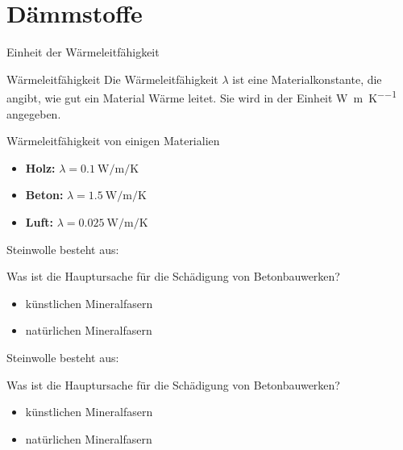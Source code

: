 \section{Dämmstoffe}
\BlueSectionSlide
\begin{frame}{Einheit der Wärmeleitfähigkeit}
	\begin{Definition_BS}{Wärmeleitfähigkeit}
		Die Wärmeleitfähigkeit $\lambda$ ist eine Materialkonstante, die angibt, wie gut ein Material Wärme leitet. Sie wird in der Einheit \si{\watt\per\meter\per\kelvin} angegeben.
	\end{Definition_BS}
	\pause
	\begin{Beispiel}{Wärmeleitfähigkeit von einigen Materialien}
		\begin{itemize}
			\item[\textbullet] \textbf{Holz:} $\lambda = \SI{0.1}{\watt\per\meter\per\kelvin}$
			\item[\textbullet] \textbf{Beton:} $\lambda = \SI{1.5}{\watt\per\meter\per\kelvin}$
			\item[\textbullet] \textbf{Luft:} $\lambda = \SI{0.025}{\watt\per\meter\per\kelvin}$
		\end{itemize}
	\end{Beispiel}
\end{frame}

\begin{frame}{Steinwolle besteht aus:}
    \begin{Fragenblock}
        Was ist die Hauptursache für die Schädigung von Betonbauwerken?
        
        \begin{itemize}
            \item[\faSquare] künstlichen Mineralfasern
            \item[\faSquare] natürlichen Mineralfasern
        \end{itemize}
    \end{Fragenblock}
\end{frame}

\begin{frame}{Steinwolle besteht aus:}
    \begin{Fragenblock}
        Was ist die Hauptursache für die Schädigung von Betonbauwerken?
        
        \begin{itemize}
			\item[\textcolor{green!70!black}{\faCheckSquare}] künstlichen Mineralfasern
			\item[\faSquare] natürlichen Mineralfasern
        \end{itemize}
    \end{Fragenblock}
\end{frame}


